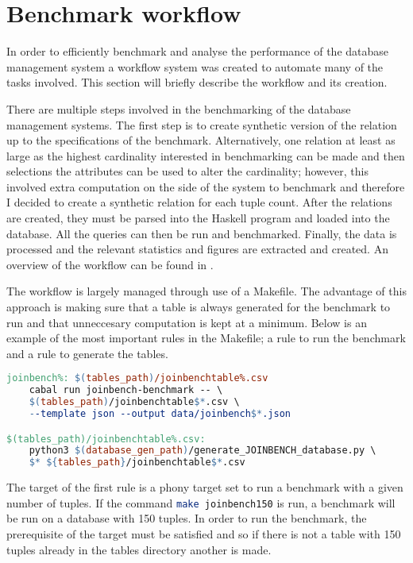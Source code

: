 \section{Benchmark workflow}\label{sec:benchmark:workflow}
In order to efficiently benchmark and analyse the performance of the database
management system a workflow system was created to automate many of the tasks
involved. This section will briefly describe the workflow and its creation.

There are multiple steps involved in the benchmarking of the database management
systems. The first step is to create synthetic version of the
 relation up to the specifications of the benchmark.
Alternatively, one relation at least as large as the highest cardinality
interested in benchmarking can be made and then selections the
 attributes can be used to alter the cardinality;
however, this involved extra computation on the side of the system to benchmark
and therefore I decided to create a synthetic relation for each tuple count.
After the relations are created, they must be parsed into the Haskell program
and loaded into the database. All the queries can then be run and benchmarked.
Finally, the data is processed and the relevant statistics and figures are
extracted and created. An overview of the workflow can be found in
.

The workflow is largely managed through use of a Makefile. The advantage of this
approach is making sure that a table is always generated for the benchmark to
run and that unneccesary computation is kept at a minimum. Below is an example
of the most important rules in the Makefile; a rule to run the benchmark and a
rule to generate the tables.

\begin{lstlisting}[language=make]
joinbench%: $(tables_path)/joinbenchtable%.csv
	cabal run joinbench-benchmark -- \
    $(tables_path)/joinbenchtable$*.csv \ 
    --template json --output data/joinbench$*.json

$(tables_path)/joinbenchtable%.csv:
	python3 $(database_gen_path)/generate_JOINBENCH_database.py \
    $* ${tables_path}/joinbenchtable$*.csv
\end{lstlisting}

The target of the first rule is a phony target set to run a benchmark with a
given number of tuples. If the command \lstinline[language=bash]{make joinbench150}
is run, a benchmark will be run on a database with 150 tuples. In
order to run the benchmark, the prerequisite of the target must be satisfied and
so if there is not a table with 150 tuples already in the tables directory
another is made.

